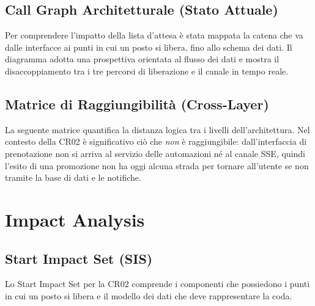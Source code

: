 \documentclass[11pt,a4paper,oneside,openany]{book}
\begin{document}
\subsection{Call Graph Architetturale (Stato Attuale)}

Per comprendere l'impatto della lista d'attesa è stata mappata la catena che
va dalle interfacce ai punti in cui un posto si libera, fino allo schema dei
dati. Il diagramma adotta una prospettiva orientata al flusso dei dati e
mostra il disaccoppiamento tra i tre percorsi di liberazione e il canale in
tempo reale.


\subsection{Matrice di Raggiungibilità (Cross-Layer)}

La seguente matrice quantifica la distanza logica tra i livelli
dell'architettura. Nel contesto della CR02 è significativo ciò che
\emph{non} è raggiungibile: dall'interfaccia di prenotazione non si arriva al
servizio delle automazioni né al canale SSE, quindi l'esito di una promozione
non ha oggi alcuna strada per tornare all'utente se non tramite la base di dati
e le notifiche.



\section{Impact Analysis}

\subsection{Start Impact Set (SIS)}

Lo Start Impact Set per la CR02 comprende i componenti che possiedono i punti
in cui un posto si libera e il modello dei dati che deve rappresentare la
coda.
\end{document}
